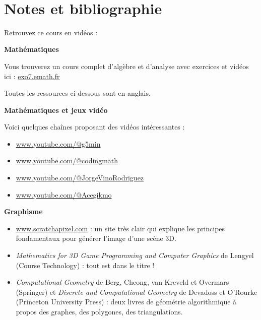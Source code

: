 
~
\thispagestyle{empty}

\clearemptydoublepage
\pagestyle{empty}\thispagestyle{empty}


\section*{Notes et bibliographie}

Retrouvez ce cours en vidéos : 


\textbf{Mathématiques}

Vous trouverez un cours complet d'algèbre et d'analyse avec exercices et vidéos ici : {\href{http://exo7.emath.fr/}{exo7.emath.fr}}

\smallskip

Toutes les ressources ci-dessous sont en anglais.


\smallskip


\textbf{Mathématiques et jeux vidéo}

Voici quelques chaînes proposant des vidéos intéressantes :
\begin{itemize}	
  \item \href{https://www.youtube.com/@g5min}{www.youtube.com/@g5min}

  \item \href{https://www.youtube.com/@codingmath}{www.youtube.com/@codingmath}

  \item \href{https://www.youtube.com/@JorgeVinoRodriguez}{www.youtube.com/@JorgeVinoRodriguez}

  \item \href{https://www.youtube.com/@Acegikmo}{www.youtube.com/@Acegikmo}
\end{itemize}

\smallskip

\textbf{Graphisme}

\begin{itemize}
	\item \href{https://www.scratchapixel.com/}{www.scratchapixel.com} : un site très clair qui explique les principes fondamentaux pour générer l'image d'une scène 3D.
	
    \item \emph{Mathematics for	3D Game Programming	and Computer Graphics} de Lengyel (Course Technology) : tout est dans le titre !	
	
	\item \emph{Computational Geometry} de Berg, Cheong, van Kreveld et Overmars (Springer) et 
	\emph{Discrete and Computational Geometry} de Devadoss et O'Rourke (Princeton University Press) :
	deux livres de géométrie algorithmique à propos des graphes, des polygones, des triangulations.

\end{itemize}

